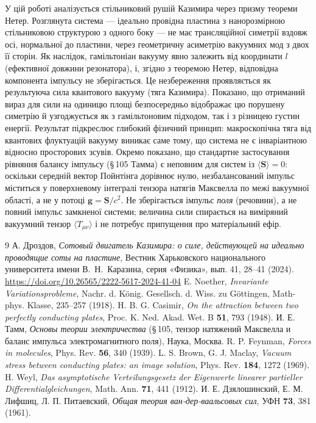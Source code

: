 \documentclass[twoside, 10pt]{article}
\begin{document}
У цій роботі аналізується стільниковий рушій Казимира через призму теореми Нетер.
Розглянута система — ідеально провідна пластина з нанорозмірною стільниковою структурою
з одного боку — не має трансляційної симетрії вздовж осі, нормальної до пластини,
через геометричну асиметрію вакуумних мод з двох її сторін. Як наслідок,
гамільтоніан вакууму явно залежить від координати \(l\) (ефективної довжини резонатора),
і, згідно з теоремою Нетер, відповідна компонента імпульсу не зберігається.
Це незбереження проявляється як результуюча сила квантового вакууму (тяга Казимира).
Показано, що отриманий вираз для сили на одиницю площі безпосередньо відображає цю порушену
симетрію й узгоджується як з гамільтоновим підходом, так і з різницею густин енергії.
Результат підкреслює глибокий фізичний принцип: макроскопічна тяга від квантових флуктуацій
вакууму виникає саме тому, що система не є інваріантною відносно просторових зсувів.
Окремо показано, що стандартне застосування рівняння балансу імпульсу (\S\,105 Тамма)
є неповним для систем із $\langle\mathbf{S}\rangle=0$: оскільки середній вектор Пойнтінга
дорівнює нулю, незбалансований імпульс міститься у поверхневому інтегралі тензора натягів
Максвелла по межі вакуумної області, а не у потоці $\mathbf{g}=\mathbf{S}/c^2$. Не
зберігається імпульс \emph{поля} (речовини), а не повний імпульс замкненої системи;
величина сили спирається на виміряний вакуумний тензор $\langle T_{\mu\nu}\rangle$ і не
потребує припущення про матеріальний ефір.

\begin{thebibliography}{9}
А. Дроздов, \textit{Сотовый двигатель Казимира: о силе, действующей на идеально проводящие соты на пластине}, Вестник Харьковского национального университета имени В.~Н.~Каразина, серия «Физика», вып. 41, 28--41 (2024). \url{https://doi.org/10.26565/2222-5617-2024-41-04}
E. Noether, \textit{Invariante Variationsprobleme}, Nachr. d. König. Gesellsch. d. Wiss. zu Göttingen, Math-phys. Klasse, 235–257 (1918).
H. B. G. Casimir, \textit{On the attraction between two perfectly conducting plates}, Proc. K. Ned. Akad. Wet. B \textbf{51}, 793 (1948).
И. Е. Тамм, \textit{Основы теории электричества} (\S\,105, тензор натяжений Максвелла и баланс импульса электромагнитного поля), Наука, Москва.
R. P. Feynman, \textit{Forces in molecules}, Phys. Rev. \textbf{56}, 340 (1939).
L. S. Brown, G. J. Maclay, \textit{Vacuum stress between conducting plates: an image solution}, Phys. Rev. \textbf{184}, 1272 (1969).
H. Weyl, \textit{Das asymptotische Verteilungsgesetz der Eigenwerte linearer partieller Differentialgleichungen}, Math. Ann. \textbf{71}, 441 (1912).
И. Е. Дзялошинский, Е. М. Лифшиц, Л. П. Питаевский, \textit{Общая теория ван-дер-ваальсовых сил}, УФН \textbf{73}, 381 (1961).
\end{thebibliography}
\end{document}
